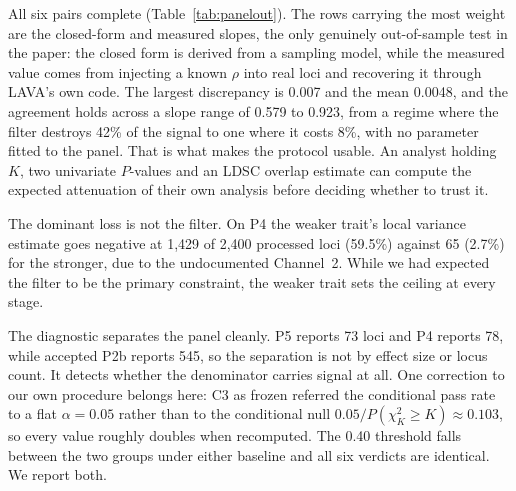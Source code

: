\documentclass[12pt,a4paper]{article}
\begin{document}
All six pairs complete (Table~\ref{tab:panelout}). The rows carrying the most weight are
the closed-form and measured slopes, the only genuinely out-of-sample test in the paper:
the closed form is derived from a sampling model, while the measured value comes from
injecting a known $\rho$ into real loci and recovering it through LAVA's own code. The
largest discrepancy is 0.007 and the mean 0.0048, and the agreement holds across a slope
range of 0.579 to 0.923, from a regime where the filter destroys 42\% of the signal to
one where it costs 8\%, with no parameter fitted to the panel. That is what makes the
protocol usable. An analyst holding $K$, two univariate
$P$-values and an LDSC overlap estimate can compute the expected attenuation of their own
analysis before deciding whether to trust it.

The dominant loss is not the filter. On P4 the weaker trait's local variance estimate goes
negative at 1,429 of 2,400 processed loci (59.5\%) against 65 (2.7\%) for the stronger, due
to the undocumented Channel~2. While we had expected the filter to be the primary
constraint, the weaker trait sets the ceiling at every stage.

The diagnostic separates the panel cleanly. P5 reports 73 loci and P4 reports 78, while
accepted P2b reports 545, so the separation is not by effect size or locus count. It
detects whether the denominator carries signal at all. One correction to our own procedure
belongs here: C3 as frozen referred the conditional pass rate to a flat
$\alpha=0.05$ rather than to the conditional null $0.05/P(\chi^2_K\ge K)\approx0.103$, so
every value roughly doubles when recomputed. The 0.40 threshold falls between the two
groups under either baseline and all six verdicts are identical. We report both.
\end{document}

